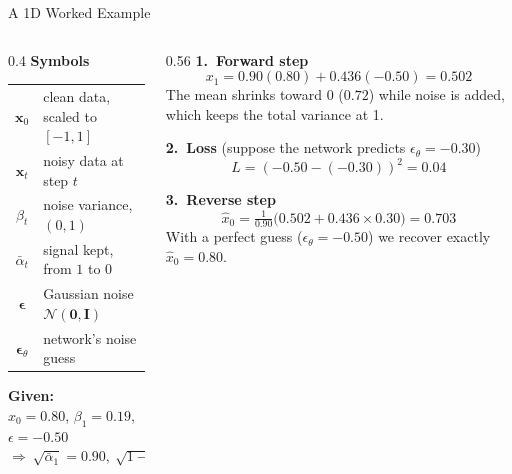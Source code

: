 \documentclass[11pt,aspectratio=169]{beamer}
\newcommand{\Head}[1]{\textcolor{Main}{\textbf{#1}}}
\begin{document}
\begin{frame}{A 1D Worked Example}
  \begin{columns}[T,onlytextwidth]
    \begin{column}{0.4\textwidth}
      \Head{Symbols}
      \vspace{0.1cm}

      \small
      \renewcommand{\arraystretch}{1.25}
      \begin{tabular}{@{}cl@{}}
        \toprule
        $\mathbf{x}_0$ & clean data, scaled to $[-1,1]$ \\
        $\mathbf{x}_t$ & noisy data at step $t$ \\
        $\beta_t$ & noise variance, $(0,1)$ \\
        $\bar\alpha_t$ & signal kept, from $1$ to $0$ \\
        $\bm\epsilon$ & Gaussian noise $\mathcal{N}(\mathbf{0},\mathbf{I})$ \\
        $\bm\epsilon_\theta$ & network's noise guess \\
        \bottomrule
      \end{tabular}

      \vspace{0.25cm}
      \textbf{Given:} 
      \vspace{0.25cm}
      \\ $x_0=0.80$, $\beta_1=0.19$, $\epsilon=-0.50$\\
      \vspace{0.25cm}
      $\Rightarrow\ \sqrt{\bar\alpha_1}=0.90,\ \sqrt{1-\bar\alpha_1}=0.436$
    \end{column}
    \begin{column}{0.56\textwidth}
      \Head{1.\ Forward step}
      \[ x_1 = 0.90(0.80) + 0.436(-0.50) = \mathbf{0.502} \]
      \small The mean shrinks toward 0 ($0.72$) while noise is added, which keeps the total variance at 1.

      \vspace{0.15cm}
      \normalsize\Head{2.\ Loss} \small (suppose the network predicts $\epsilon_\theta=-0.30$)
      \[ L = (-0.50 - (-0.30))^2 = \mathbf{0.04} \]

      \normalsize\Head{3.\ Reverse step}
      \[ \hat{x}_0 = \tfrac{1}{0.90}\big(0.502 + 0.436\times0.30\big) = \mathbf{0.703} \]
      \small With a perfect guess ($\epsilon_\theta=-0.50$) we recover exactly $\hat{x}_0=0.80$.
    \end{column}
  \end{columns}
\end{frame}
\end{document}
